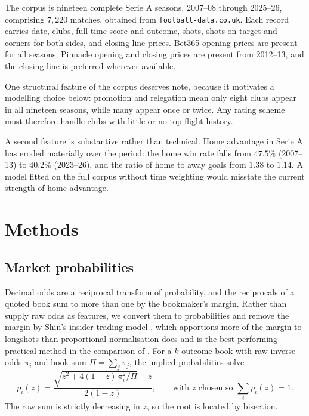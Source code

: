 \documentclass[11pt]{article}
\begin{document}
The corpus is nineteen complete Serie A seasons, 2007--08 through 2025--26,
comprising $7{,}220$ matches, obtained from \texttt{football-data.co.uk}. Each
record carries date, clubs, full-time score and outcome, shots, shots on target
and corners for both sides, and closing-line prices. Bet365 opening prices are
present for all seasons; Pinnacle opening and closing prices are present from
2012--13, and the closing line is preferred wherever available.

One structural feature of the corpus deserves note, because it motivates a
modelling choice below: promotion and relegation mean only eight clubs appear in
all nineteen seasons, while many appear once or twice. Any rating scheme must
therefore handle clubs with little or no top-flight history.

A second feature is substantive rather than technical. Home advantage in Serie A
has eroded materially over the period: the home win rate falls from $47.5\%$
(2007--13) to $40.2\%$ (2023--26), and the ratio of home to away goals from
$1.38$ to $1.14$. A model fitted on the full corpus without time weighting would
misstate the current strength of home advantage.

\section{Methods}
\label{sec:methods}

\subsection{Market probabilities}

Decimal odds are a reciprocal transform of probability, and the reciprocals of a
quoted book sum to more than one by the bookmaker's margin. Rather than supply
raw odds as features, we convert them to probabilities and remove the margin by
Shin's insider-trading model \citep{shin1993}, which apportions more of the
margin to longshots than proportional normalisation does and is the
best-performing practical method in the comparison of \citet{strumbelj2014}. For
a $k$-outcome book with raw inverse odds $\pi_i$ and book sum $\Pi = \sum_j
\pi_j$, the implied probabilities solve
\begin{equation}
p_i(z) = \frac{\sqrt{z^2 + 4(1-z)\,\pi_i^2/\Pi} - z}{2(1-z)},
\qquad \text{with } z \text{ chosen so } \sum_i p_i(z) = 1 .
\end{equation}
The row sum is strictly decreasing in $z$, so the root is located by bisection.
\end{document}
